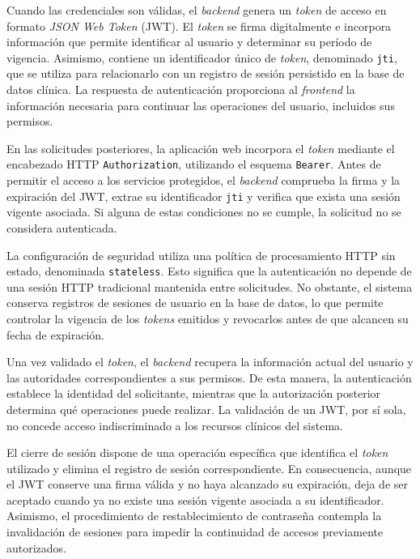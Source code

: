Cuando las credenciales son válidas, el \textit{backend} genera un \textit{token} de acceso en formato \textit{JSON Web Token} (JWT).
 El \textit{token} se firma digitalmente e incorpora información que permite identificar al usuario y determinar su período de vigencia. Asimismo, contiene un identificador único de \textit{token}, denominado \texttt{jti}, que se utiliza para relacionarlo con un registro de sesión persistido en la base de datos clínica. La respuesta de autenticación proporciona al \textit{frontend} la información necesaria para continuar las operaciones del usuario, incluidos sus permisos.

En las solicitudes posteriores, la aplicación web incorpora el \textit{token} mediante el encabezado HTTP \texttt{Authorization}, utilizando el esquema \texttt{Bearer}. Antes de permitir el acceso a los servicios protegidos, el \textit{backend} comprueba la firma y la expiración del JWT, extrae su identificador \texttt{jti} y verifica que exista una sesión vigente asociada. Si alguna de estas condiciones no se cumple, la solicitud no se considera autenticada.

La configuración de seguridad utiliza una política de procesamiento HTTP sin estado, denominada \texttt{stateless}. Esto significa que la autenticación no depende de una sesión HTTP tradicional mantenida entre solicitudes. No obstante, el sistema conserva registros de sesiones de usuario en la base de datos, lo que permite controlar la vigencia de los \textit{tokens} emitidos y revocarlos antes de que alcancen su fecha de expiración.

Una vez validado el \textit{token}, el \textit{backend} recupera la información actual del usuario y las autoridades correspondientes a sus permisos. De esta manera, la autenticación establece la identidad del solicitante, mientras que la autorización posterior determina qué operaciones puede realizar. La validación de un JWT, por sí sola, no concede acceso indiscriminado a los recursos clínicos del sistema.

El cierre de sesión dispone de una operación específica que identifica el \textit{token} utilizado y elimina el registro de sesión correspondiente. En consecuencia, aunque el JWT conserve una firma válida y no haya alcanzado su expiración, deja de ser aceptado cuando ya no existe una sesión vigente asociada a su identificador. Asimismo, el procedimiento de restablecimiento de contraseña contempla la invalidación de sesiones para impedir la continuidad de accesos previamente autorizados.

